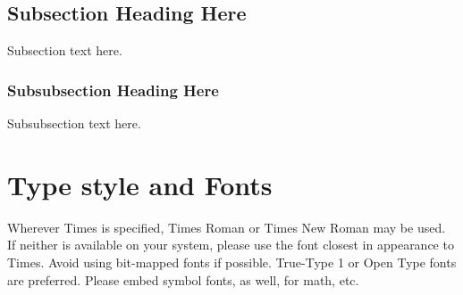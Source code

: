 \documentclass[conference, a4paper]{IEEEtran}
\begin{document}
\subsection{Subsection Heading Here}
Subsection text here.


\subsubsection{Subsubsection Heading Here}
Subsubsection text here.

\section{Type style and Fonts}
Wherever Times is specified, Times Roman or Times New Roman may be used. If neither is available on your system, please use the font closest in appearance to Times. Avoid using bit-mapped fonts if possible. True-Type 1 or Open Type fonts are preferred. Please embed symbol fonts, as well, for math, etc.


%
%

\end{document}
